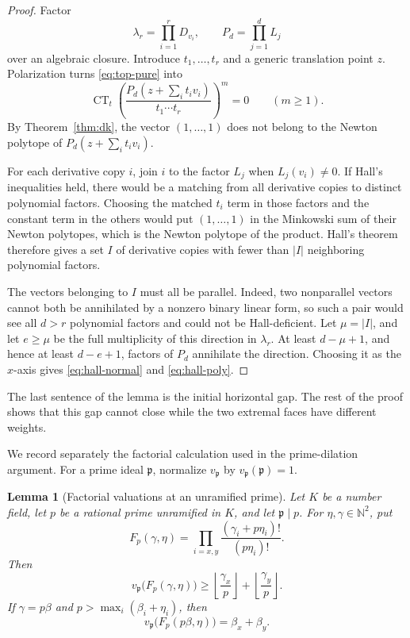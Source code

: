 \documentclass[11pt]{article}
\newtheorem{lemma}[theorem]{Lemma}
\newcommand{\N}{\mathbb N}
\newcommand{\CT}{\operatorname{CT}}
\begin{document}
\begin{proof}
Factor
\[
 \lambda_r=\prod_{i=1}^r D_{v_i},
 \qquad P_d=\prod_{j=1}^d L_j
\]
over an algebraic closure.  Introduce $t_1,\ldots,t_r$ and a generic
translation point $z$.  Polarization turns \eqref{eq:top-pure} into
\[
 \CT_t\left(
   \frac{P_d(z+\sum_i t_iv_i)}{t_1\cdots t_r}
          \right)^m=0
 \qquad(m\geq1).
\]
By Theorem~\ref{thm:dk}, the vector $(1,\ldots,1)$ does not belong to the
Newton polytope of $P_d(z+\sum_i t_iv_i)$.

For each derivative copy $i$, join $i$ to the factor $L_j$ when
$L_j(v_i)\ne0$.  If Hall's inequalities held, there would be a matching
from all derivative copies to distinct polynomial factors.  Choosing the
matched $t_i$ term in those factors and the constant term in the others
would put $(1,\ldots,1)$ in the Minkowski sum of their Newton polytopes,
which is the Newton polytope of the product.  Hall's theorem therefore gives
a set $I$ of derivative copies with fewer than $|I|$ neighboring polynomial
factors.

The vectors belonging to $I$ must all be parallel.  Indeed, two
nonparallel vectors cannot both be annihilated by a nonzero binary linear
form, so such a pair would see all $d>r$ polynomial factors and could not
be Hall-deficient.  Let $\mu=|I|$, and let $e\geq\mu$ be the full
multiplicity of this direction in $\lambda_r$.  At least $d-\mu+1$, and
hence at least $d-e+1$, factors of $P_d$ annihilate the direction.  Choosing
it as the $x$-axis gives \eqref{eq:hall-normal} and
\eqref{eq:hall-poly}.
\end{proof}

The last sentence of the lemma is the initial horizontal gap.  The rest of
the proof shows that this gap cannot close while the two extremal faces have
different weights.

We record separately the factorial calculation used in the prime-dilation
argument.  For a prime ideal $\mathfrak p$, normalize
$v_{\mathfrak p}$ by $v_{\mathfrak p}(\mathfrak p)=1$.

\begin{lemma}[Factorial valuations at an unramified prime]
\label{lem:factorial-valuations}
Let $K$ be a number field, let $p$ be a rational prime unramified in $K$,
and let $\mathfrak p\mid p$.  For $\eta,\gamma\in\N^2$, put
\[
 F_p(\gamma,\eta)=
 \prod_{i=x,y}\frac{(\gamma_i+p\eta_i)!}{(p\eta_i)!}.
\]
Then
\begin{equation}\label{eq:factorial-lower}
 v_{\mathfrak p}\bigl(F_p(\gamma,\eta)\bigr)
 \geq
 \left\lfloor\frac{\gamma_x}{p}\right\rfloor+
 \left\lfloor\frac{\gamma_y}{p}\right\rfloor.
\end{equation}
If $\gamma=p\beta$ and
$p>\max_i(\beta_i+\eta_i)$, then
\begin{equation}\label{eq:factorial-exact}
 v_{\mathfrak p}\bigl(F_p(p\beta,\eta)\bigr)
 =\beta_x+\beta_y.
\end{equation}
\end{lemma}
\end{document}

